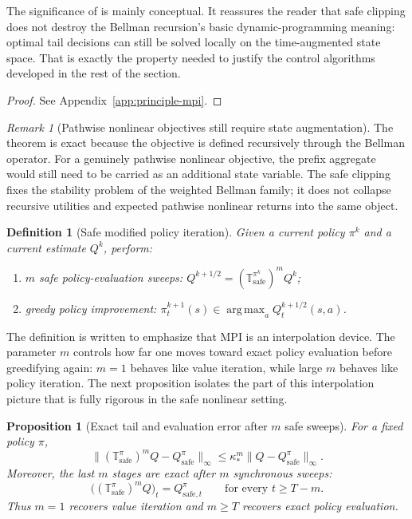 \documentclass{article}
\newtheorem{proposition}[proposition]{Proposition}
\newtheorem{definition}[definition]{Definition}
\theoremstyle{remark}
\newtheorem{remark}[remark]{Remark}
\DeclareMathOperator*{\argmax}{arg\,max}
\newcommand{\safe}{\mathrm{safe}}
\begin{document}
The significance of  is mainly conceptual.
It reassures the reader that safe clipping does not destroy the Bellman recursion's basic dynamic-programming meaning: optimal tail decisions can still be solved locally on the time-augmented state space.
That is exactly the property needed to justify the control algorithms developed in the rest of the section.

\begin{proof}
See Appendix~\ref{app:principle-mpi}.
\end{proof}

\begin{remark}[Pathwise nonlinear objectives still require state augmentation]
\label{rem:pathwise-augmentation}
The theorem is exact because the objective is defined recursively through the Bellman operator.
For a genuinely pathwise nonlinear objective, the prefix aggregate would still need to be carried as an additional state variable.
The safe clipping fixes the stability problem of the weighted Bellman family; it does not collapse recursive utilities and expected pathwise nonlinear returns into the same object.
\end{remark}

\begin{definition}[Safe modified policy iteration]
\label{def:lse-mpi}
Given a current policy $\pi^k$ and a current estimate $Q^k$, perform:
\begin{enumerate}[leftmargin=1.5em,itemsep=2pt]
    \item $m$ safe policy-evaluation sweeps: $Q^{k+1/2}=(\mathbb T_\safe^{\pi^k})^mQ^k$;
    \item greedy policy improvement: $\pi^{k+1}_t(s)\in\argmax_a Q^{k+1/2}_t(s,a)$.
\end{enumerate}
\end{definition}

The definition is written to emphasize that MPI is an interpolation device.
The parameter $m$ controls how far one moves toward exact policy evaluation before greedifying again: $m=1$ behaves like value iteration, while large $m$ behaves like policy iteration.
The next proposition isolates the part of this interpolation picture that is fully rigorous in the safe nonlinear setting.

\begin{proposition}[Exact tail and evaluation error after $m$ safe sweeps]
\label{prop:mpi-tail-exact}
For a fixed policy $\pi$,
\begin{equation}
\|(\mathbb T_\safe^{\pi})^mQ - Q_\safe^{\pi}\|_\infty
\le
\kappa_*^m\|Q-Q_\safe^{\pi}\|_\infty.
\label{eq:mpi-tail-rate}
\end{equation}
Moreover, the last $m$ stages are exact after $m$ synchronous sweeps:
\[
\bigl((\mathbb T_\safe^{\pi})^mQ\bigr)_t = Q_{\safe,t}^{\pi}
\qquad\text{for every } t\ge T-m.
\]
Thus $m=1$ recovers value iteration and $m\ge T$ recovers exact policy evaluation.
\end{proposition}
\end{document}
